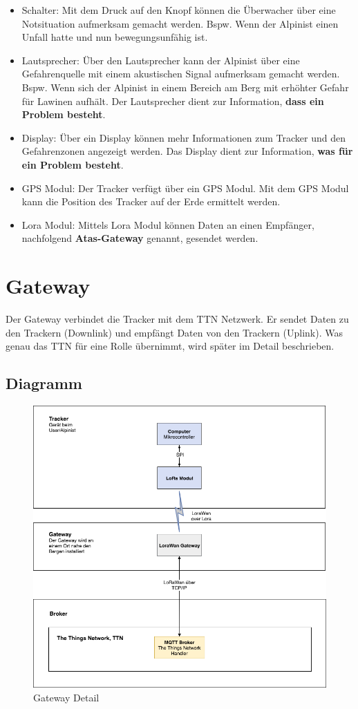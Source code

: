 \documentclass[11pt,english,german]{report}
\theoremstyle{definition}
\begin{document}
\begin{itemize}
	\item
	Schalter: Mit dem Druck auf den Knopf können die Überwacher über eine Notsituation aufmerksam gemacht werden. Bspw. Wenn der Alpinist einen Unfall hatte und nun bewegungsunfähig ist.
	\item
	Lautsprecher: Über den Lautsprecher kann der Alpinist über eine Gefahrenquelle mit einem akustischen Signal aufmerksam gemacht werden. Bspw. Wenn sich der Alpinist in einem Bereich am Berg mit erhöhter Gefahr für Lawinen aufhält. Der Lautsprecher dient zur Information, \textbf{dass ein Problem besteht}.
	\item
	Display: Über ein Display können mehr Informationen zum Tracker und den Gefahrenzonen angezeigt werden. Das Display dient zur Information, \textbf{was für ein Problem besteht}.
	\item
	GPS Modul: Der Tracker verfügt über ein GPS Modul. Mit dem GPS Modul kann die Position des Tracker auf der Erde ermittelt werden.
	\item 
	Lora Modul: Mittels Lora Modul können Daten an einen Empfänger, nachfolgend \textbf{Atas-Gateway} genannt, gesendet werden.
\end{itemize}

\newpage
\section{Gateway}
Der Gateway verbindet die Tracker mit dem \gls{TTN} Netzwerk. Er sendet Daten zu den Trackern (\gls{Downlink}) und empfängt Daten von den Trackern (\gls{Uplink}). Was genau das TTN für eine Rolle übernimmt, wird später im Detail beschrieben.
\subsection{Diagramm}
\begin{figure}[H]
	\centering
	\includegraphics[width=\textwidth]{img/system/ATAS_SystemOverview_Detail_Gateway_BA.png}
	\caption[Gateway Detail]
	{Gateway Detail}
\end{figure}
\end{document}

